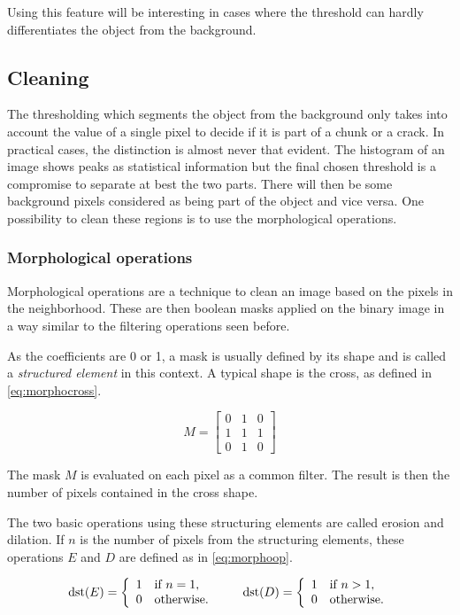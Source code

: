 Using this feature will be interesting in cases where the threshold can hardly differentiates the object from the background.

\subsection{Cleaning}

The thresholding which segments the object from the background only takes into account the value of a single pixel to decide if it is part of a chunk or a crack. In practical cases, the distinction is almost never that evident. The histogram of an image shows peaks as statistical information but the final chosen threshold is a compromise to separate at best the two parts. There will then be some background pixels considered as being part of the object and vice versa. One possibility to clean these regions is to use the morphological operations.

\subsubsection{Morphological operations}

Morphological operations are a technique to clean an image based on the pixels in the neighborhood. These are then boolean masks applied on the binary image in a way similar to the filtering operations seen before.

As the coefficients are 0 or 1, a mask is usually defined by its shape and is called a \emph{structured element} in this context. A typical shape is the cross, as defined in \eqref{eq:morphocross}.

\begin{equation}
\label{eq:morphocross}
M =
\begin{bmatrix}
0 & 1 & 0 \\
1 & 1 & 1 \\
0 & 1 & 0
\end{bmatrix}
\end{equation}

The mask $M$ is evaluated on each pixel as a common filter. The result is then the number of pixels contained in the cross shape.

The two basic operations using these structuring elements are called erosion and dilation. If $n$ is the number of pixels from the structuring elements, these operations $E$ and $D$ are defined as in \eqref{eq:morphoop}.

\begin{equation}
\label{eq:morphoop}
\operatorname{dst}(E) =
\left\{
\begin{array}{l l}
    1 & \text{if } n = 1,\\
    0 & \text{otherwise}.
\end{array}
\right. \qquad
\operatorname{dst}(D) =
\left\{
\begin{array}{l l}
    1 & \text{if } n > 1,\\
    0 & \text{otherwise}.
\end{array}
\right.
\end{equation}

